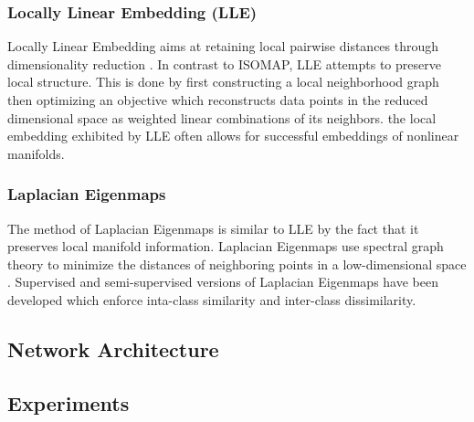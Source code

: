 \documentclass[conference]{IEEEtran}
\begin{document}
	\subsubsection*{Locally Linear Embedding (LLE)} Locally Linear Embedding aims at retaining local pairwise distances through dimensionality reduction \cite{Roweis2000LLE,Saul2001LLEIntro}.  In contrast to ISOMAP, LLE attempts to preserve local structure.  This is done by first constructing a local neighborhood graph then optimizing an objective which reconstructs data points in the reduced dimensional space as weighted linear combinations of its neighbors.  the local embedding exhibited by LLE often allows for successful embeddings of nonlinear manifolds.
	\subsubsection*{Laplacian Eigenmaps}  The method of Laplacian Eigenmaps is similar to LLE by the fact that it preserves local manifold information.  Laplacian Eigenmaps use spectral graph theory to minimize the distances of neighboring points in a low-dimensional space \cite{Belkin2003LaplacianEigenmaps,VanDerMaaten2009DRReview}.  Supervised and semi-supervised versions of Laplacian Eigenmaps have been developed which enforce inta-class similarity and inter-class dissimilarity.  
	 

	\subsection{Network Architecture}
	
	
	
	





	


\subsection{Experiments} \label{Experiments}
\end{document}
